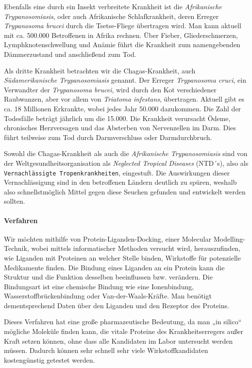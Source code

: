 \documentclass[10pt]{article}
\begin{document}
    Ebenfalls eine durch ein Insekt verbreitete Krankheit ist die \emph{Afrikanische Trypanosomiasis}, oder auch
    Afrikanische Schlafkrankheit, deren Erreger \emph{Trypanosoma brucei} durch die Tsetse-Fliege übertragen wird.
    Man kann
    aktuell mit ca. 500.000 Betroffenen in Afrika rechnen.\cite{25} Über Fieber, Gliederschmerzen,
    Lymphknotenschwellung und
    Anämie führt die Krankheit zum namengebenden Dämmerzustand und anschließend zum Tod.

    Als dritte Krankheit betrachten wir die Chagas-Krankheit, auch \emph{Südamerikanische Trypanosomiasis} genannt. Der
    Erreger \emph{Trypanosoma cruci}, ein Verwandter der \emph{Trypanosoma brucei}, wird durch den Kot verschiedener
    Raubwanzen,
    aber vor allem von \emph{Triatoma infestans}, übertragen.\cite{27} Aktuell gibt es ca. 18 Millionen Erkrankte,
    wobei
    jedes Jahr
    50.000 dazukommen. Die Zahl der Todesfälle beträgt jährlich um die 15.000. Die Krankheit verursacht Ödeme,
    chronisches Herzversagen und das Absterben von Nervenzellen im Darm. Dies führt teilweise zum Tod durch
    Darmverschluss oder Darmdurchbruch.

    Sowohl die Chagas-Krankheit als auch die \emph{Afrikanische Trypanosomiasis} sind von der
    Weltgesundheitsorganisation
    als \emph{Neglected Tropical Diseases} (NTD´s), also als \texttt{Vernachlässigte Tropenkrankheiten}, eingestuft. Die
    Auswirkungen dieser Vernachlässigung sind in den betroffenen Ländern deutlich zu spüren, weshalb also
    schnellstmöglich Mittel gegen diese Seuchen gefunden und entwickelt werden sollten.

    \paragraph{Verfahren}
    Wir möchten mithilfe von Protein-Liganden-Docking, einer Molecular Modelling-Technik, wobei mittels
    informatischer Methoden versucht wird, herauszufinden, wie Liganden mit Proteinen an welcher Stelle binden,
    Wirkstoffe für potenzielle Medikamente finden. Die Bindung eines Liganden an ein Protein kann die Struktur und
    die Funktion desselben beeinflussen bzw. verändern.\cite{23} Die Bindungsart ist eine chemische Bindung wie eine
    Ionenbindung, Wasserstoffbrückenbindung oder Van-der-Waals-Kräfte. Man benötigt dementsprechend Daten über den
    Liganden und den Rezeptor des Proteins.\cite{38}

    Dieses Verfahren hat eine große pharmazeutische Bedeutung, da man „in silico“ mögliche Moleküle finden kann, die
    vitale Proteine
    des Krankheitserregers außer Kraft setzen können, ohne dass alle Kandidaten im Labor untersucht werden müssen.
    Dadurch können sehr schnell sehr viele Wirkstoffkandidaten kostengünstig getestet werden.
\end{document}
